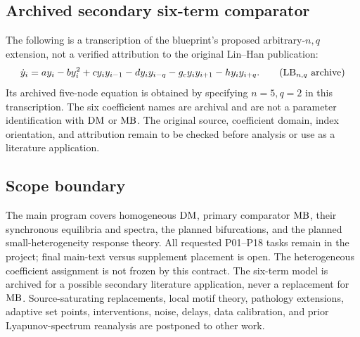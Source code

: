 \subsection{Archived secondary six-term comparator}
The following is a transcription of the blueprint's proposed arbitrary-$n,q$
extension, not a verified attribution to the original Lin--Han publication:
\begin{equation}
\label{eq:archived-lb}
\dot{y}_i=a y_i-b y_i^2+c y_i y_{i-1}-d y_i y_{i-q}
                    -g_{\mathrm c}y_i y_{i+1}-h y_i y_{i+q}.
\tag{$\LB_{n,q}$ archive}
\end{equation}
Its archived five-node equation is obtained by specifying $n=5,q=2$ in this
transcription. The six coefficient names are archival and are not a parameter
identification with $\mathrm{DM}$ or $\mathrm{MB}$. The original source, coefficient domain,
index orientation, and attribution remain to be checked before analysis or
use as a literature application.

\subsection{Scope boundary}
The main program covers homogeneous $\mathrm{DM}$, primary comparator $\mathrm{MB}$, their
synchronous equilibria and spectra, the planned bifurcations, and the planned
small-heterogeneity response theory. All requested P01--P18 tasks remain in
the project; final main-text versus supplement placement is open.
The heterogeneous coefficient assignment is not frozen by this contract.
The six-term model is archived for a possible secondary literature application,
never a replacement for $\mathrm{MB}$. Source-saturating replacements, local motif
theory, pathology extensions, adaptive set points, interventions, noise,
delays, data calibration, and prior Lyapunov-spectrum reanalysis are postponed
to other work. 
